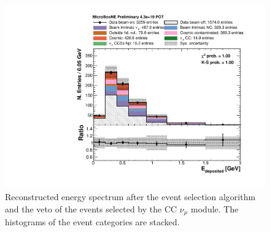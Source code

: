 \begin{figure}[htbp]
\centering
  \includegraphics[width=0.65\linewidth]{figures/h_fixed_energy.pdf}
  \caption{Reconstructed energy spectrum after the event selection algorithm and the veto of the events selected by the CC $\nu_{\mu}$ module. The histograms of the event categories are stacked.}
  \label{fig:spectrum}
\end{figure}
